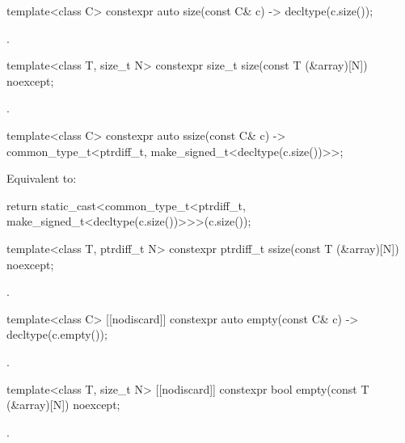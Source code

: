 %
\begin{itemdecl}
template<class C> constexpr auto size(const C& c) -> decltype(c.size());
\end{itemdecl}
\begin{itemdescr}
\pnum
\returns
{}.
\end{itemdescr}

%
\begin{itemdecl}
template<class T, size_t N> constexpr size_t size(const T (&array)[N]) noexcept;
\end{itemdecl}
\begin{itemdescr}
\pnum
\returns
{}.
\end{itemdescr}

%
\begin{itemdecl}
template<class C> constexpr auto ssize(const C& c)
  -> common_type_t<ptrdiff_t, make_signed_t<decltype(c.size())>>;
\end{itemdecl}
\begin{itemdescr}
\pnum
\effects
Equivalent to:
\begin{codeblock}
return static_cast<common_type_t<ptrdiff_t, make_signed_t<decltype(c.size())>>>(c.size());
\end{codeblock}
\end{itemdescr}

%
\begin{itemdecl}
template<class T, ptrdiff_t N> constexpr ptrdiff_t ssize(const T (&array)[N]) noexcept;
\end{itemdecl}
\begin{itemdescr}
\pnum
\returns
{}.
\end{itemdescr}

%
\begin{itemdecl}
template<class C> [[nodiscard]] constexpr auto empty(const C& c) -> decltype(c.empty());
\end{itemdecl}
\begin{itemdescr}
\pnum
\returns
{}.
\end{itemdescr}

%
\begin{itemdecl}
template<class T, size_t N> [[nodiscard]] constexpr bool empty(const T (&array)[N]) noexcept;
\end{itemdecl}
\begin{itemdescr}
\pnum
\returns
{}.
\end{itemdescr}

